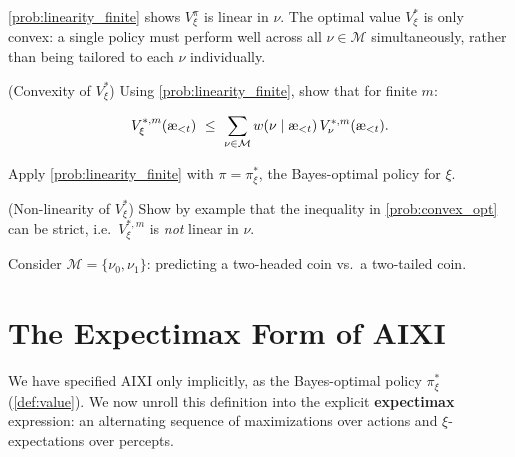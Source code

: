 \documentclass[fontsize=11pt, parskip=half]{scrartcl}
\newcommand{\cM}{\mathcal{M}}
\newcommand{\aes}{\textnormal{\ae}}
\begin{document}
\cref{prob:linearity_finite} shows $V_\xi^\pi$ is linear in $\nu$.
The optimal value $V_\xi^*$ is only convex: a single policy must perform well across all $\nu \in \cM$ simultaneously, rather than being tailored to each $\nu$ individually.

\begin{exercise}
\label{prob:convex_opt}
\skippable
(Convexity of $V_\xi^*$)
Using \cref{prob:linearity_finite}, show that for finite $m$:

\[
    V_\xi^{*,m}(\aes_{<t}) ~\leq~ \sum_{\nu \in \cM} w(\nu \mid \aes_{<t})\, V_\nu^{*,m}(\aes_{<t}).
\]
\begin{hint}
Apply \cref{prob:linearity_finite} with $\pi = \pi_\xi^*$, the Bayes-optimal policy for $\xi$.
\end{hint}
\end{exercise}


\begin{exercise}
\label{prob:nonlinear_opt}
\skippable
(Non-linearity of $V_\xi^*$)
Show by example that the inequality in \cref{prob:convex_opt} can be strict, i.e.\ $V_\xi^{*,m}$ is \emph{not} linear in $\nu$.


\begin{hint}
Consider $\cM = \{\nu_0, \nu_1\}$: predicting a two-headed coin vs.\ a two-tailed coin.
\end{hint}
\end{exercise}


\section{The Expectimax Form of AIXI}\label{prob:expectimax}

We have specified AIXI only implicitly, as the Bayes-optimal policy $\pi_\xi^*$ (\cref{def:value}).
We now unroll this definition into the explicit \textbf{expectimax} expression: an alternating sequence of maximizations over actions and $\xi$-expectations over percepts.
\end{document}
